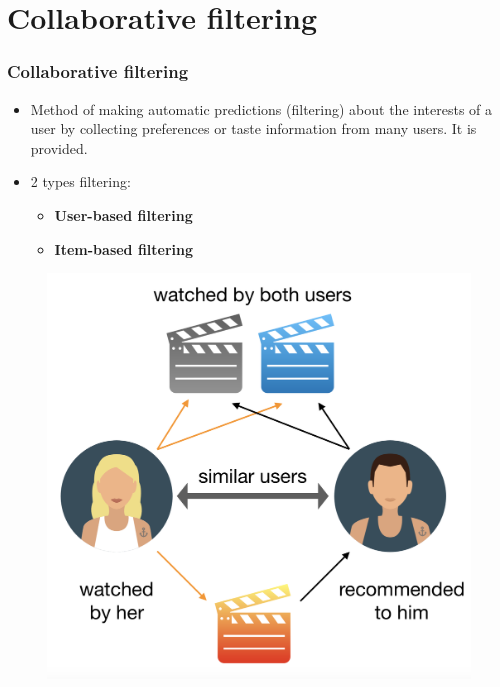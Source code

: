 \section[Collaborative filtering]{Collaborative filtering}
\begin{frame}
	\frametitle{Collaborative filtering}
	
    \hspace{-1cm}
	\begin{minipage}{0.7\linewidth}
    \begin{itemize}\itemsep1em
		\item Method of making automatic predictions (filtering) about the interests of a user by collecting preferences or taste information from many users. It is provided.
		\item 2 types filtering:
		\fontsize{10}{14}\selectfont
		\begin{itemize}
    	  \item \textbf{User-based filtering}
    	  \item \textbf{Item-based filtering}
    	 \end{itemize}
    	 \end{itemize}
	\end{minipage}
    \hspace{0.1cm}
    \begin{minipage}{0.3\linewidth}
        \begin{figure}
            \includegraphics[scale=0.09]{figures/collaborative.png}
		\end{figure}
    \end{minipage}
\end{frame}
